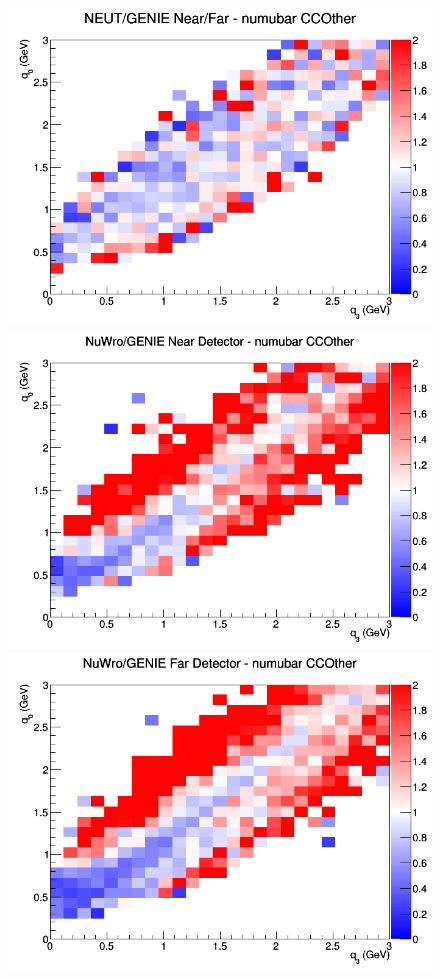 \begin{figure}[h]
\endminipage
{}
\includegraphics[width=\linewidth]{eff_q0_q3/FGT/ratios/CCOther_NEUT_GENIE_numubar_NF_q3_q0.png}
\endminipage
\newline
{}
\includegraphics[width=\linewidth]{eff_q0_q3/FGT/ratios/CCOther_NuWro_GENIE_numubar_near_q3_q0.png}
\endminipage
{}
\includegraphics[width=\linewidth]{eff_q0_q3/FGT/ratios/CCOther_NuWro_GENIE_numubar_far_q3_q0.png}

\end{figure}
